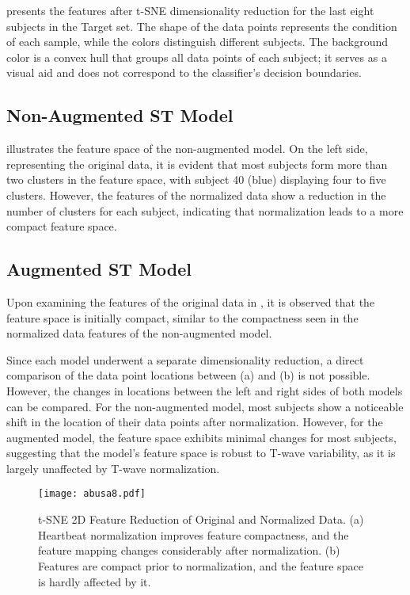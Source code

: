  presents the features after t-SNE dimensionality reduction for the last eight subjects in the Target set. The shape of the data points represents the condition of each sample, while the colors distinguish different subjects. 
The background color is a convex hull that groups all data points of each subject; it serves as a visual aid and does not correspond to the classifier's decision boundaries.
\subsection{Non-Augmented ST Model}
 illustrates the feature space of the non-augmented model. On the left side, representing the original data, it is evident that most subjects form more than two clusters in the feature space, with subject 40 (blue) displaying four to five clusters. However, the features of the normalized data show a reduction in the number of clusters for each subject, indicating that normalization leads to a more compact feature space.

\subsection{Augmented ST Model}
Upon examining the features of the original data in , it is observed that the feature space is initially compact, similar to the compactness seen in the normalized data features of the non-augmented model.

Since each model underwent a separate dimensionality reduction, a direct comparison of the data point locations between (a) and (b) is not possible. However, the changes in locations between the left and right sides of both models can be compared.
For the non-augmented model, most subjects show a noticeable shift in the location of their data points after normalization. However, for the augmented model, the feature space exhibits minimal changes for most subjects, suggesting that the model's feature space is robust to T-wave variability, as it is largely unaffected by T-wave normalization.

\begin{figure}[!t]
    \centering
    \texttt{[image: abusa8.pdf]}
    \caption[t-SNE 2D Feature Reduction of Original and Normalized Data]
        {
            t-SNE 2D Feature Reduction of Original and Normalized Data.
            (a) Heartbeat normalization improves feature compactness, and the feature mapping changes considerably after normalization.
            (b) Features are compact prior to normalization, and the feature space is hardly affected by it.
        }
    \label{fig:tsne_graphs}
\end{figure}
